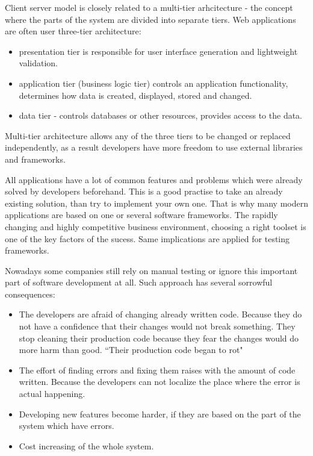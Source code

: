     	Client server model is closely related to a multi-tier arhcitecture - the concept where
    	 the parts of the system are divided into separate tiers. Web applications
    	 are often user three-tier architecture:
    	 \begin{itemize}
    	   \item presentation tier is responsible for user interface generation and
    	   lightweight validation.
    	   \item application tier (business logic tier) controls an application
    	   functionality, determines how data is created, displayed, stored and
    	   changed.
    	   \item data tier - controls databases or other resources, provides access
    	   to the data.
    	 \end{itemize}
    	Multi-tier architecture allows any of the three tiers to be changed or
    	replaced independently, as a result developers have more freedom to use
    	external libraries and frameworks.
		
		All	applications have a lot of common features and problems which were already
		solved by developers beforehand. This is a good practise to take an already
		existing solution, than try to implement your own one. That is why many modern applications 
		are based on one or several software frameworks. The rapidly changing and
		highly competitive business environment, choosing a right toolset is one of the key factors of the sucess.
		Same implications are applied for testing frameworks. 	
		
		Nowadays some companies still rely on manual testing or ignore this
		important part of software development at all. Such approach has several
		sorrowful consequences:
		\begin{itemize}
			\item The developers are afraid of changing already written
			code. Because they do not have a confidence that their changes would not 
			break something. They stop cleaning their production code because they fear the
			changes would do more harm than good. ``Their production code began to rot"
			\cite[p.123]{cleanCode} 
			
			\item The effort of finding errors and	fixing them raises with the amount of code written.
			Because the developers can not localize the place where the error is actual
			happening.
			\item Developing new features become harder, if they are based on the part
			of the system which have errors.
		
			\item Cost increasing of the whole system.
	 	 \end{itemize}
	 	 
